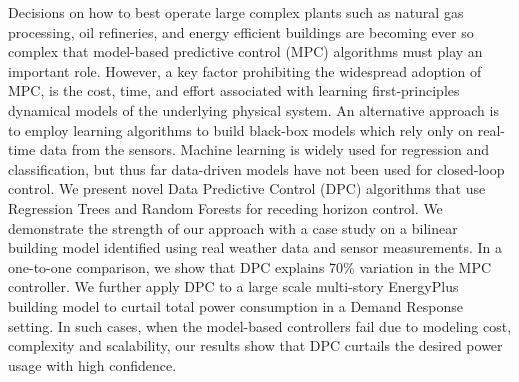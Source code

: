 Decisions on how to best operate large complex plants such as natural gas processing, oil refineries, and energy efficient buildings are becoming ever so complex that model-based predictive control (MPC) algorithms must play an important role. However, a key factor prohibiting the widespread adoption of MPC, is the cost, time, and effort associated with learning first-principles dynamical models of the underlying physical system. An alternative approach is to employ learning algorithms to build black-box models which rely only on real-time data from the sensors. Machine learning is widely used for regression and classification, but thus far data-driven models have not been used for closed-loop control. We present novel Data Predictive Control (DPC) algorithms that use Regression Trees and Random Forests for receding horizon control. 
We demonstrate the strength of our approach with a case study on a bilinear building model identified using real weather data and sensor measurements. 
In a one-to-one comparison, we show that DPC explains 70\% variation in the MPC controller.
We further apply DPC to a large scale multi-story EnergyPlus building model to curtail total power consumption in a Demand Response setting. 
In such cases, when the model-based controllers fail due to modeling cost, complexity and scalability, our results show that DPC curtails the desired power usage with high confidence.